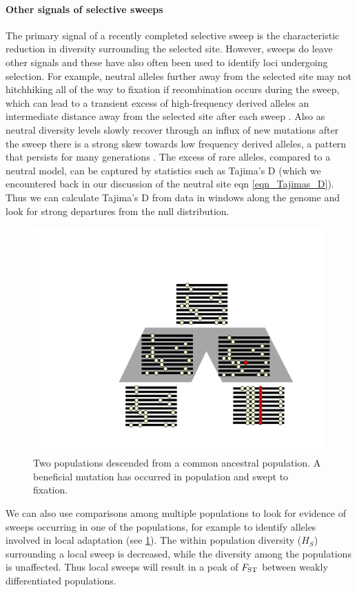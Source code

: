 \paragraph{Other signals of selective sweeps}
The primary signal of a recently completed selective sweep is the
characteristic reduction in diversity surrounding the selected site.
However, sweeps do leave other signals and these have also often been
used to identify loci undergoing selection. 
For example, neutral alleles further away from the selected site may not
hitchhiking all of the way to fixation if recombination occurs during
the sweep, which can lead to a transient excess of high-frequency
derived alleles an intermediate distance away from the selected site
after each sweep \citep{Fay:00,Przeworski:02,Kim:06}.
Also as neutral diversity levels slowly recover through an influx of
new mutations after the sweep there is a strong skew towards low
frequency derived alleles, a pattern that persists for many
generations \citep{Braverman:95, Przeworski:02,Kim:06}. The excess of
rare alleles, compared to a neutral model, can be captured by statistics such as Tajima's D (which
we encountered back in our discussion of the neutral site eqn
\ref{eqn_Tajimas_D}). Thus we can calculate Tajima's D from data in
windows along the genome and look for
strong departures from the null distribution.


\begin{figure}
\begin{center}
\includegraphics[width=0.5 \textwidth]{figures/Hitchhiking/two_pops_sweep.pdf}
\end{center}
\caption{Two populations descended from a common ancestral
  population. A beneficial mutation has occurred in population and
  swept to fixation.} \label{fig:local_sweep_haps}
\end{figure}

We can also use comparisons among multiple populations to look for evidence of sweeps occurring in one of the
populations, for example to identify alleles involved in local adaptation (see \ref{fig:local_sweep_haps}). The within population diversity ($H_S$)
surrounding a local sweep is decreased, while the diversity among the
populations is unaffected. Thus local sweeps will result in a peak of
$F_{\mathrm{ST}}$ between weakly differentiated populations. 

